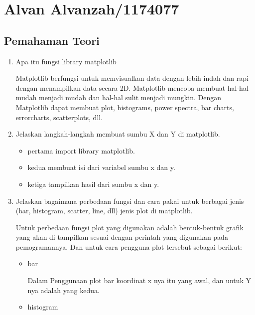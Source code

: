 \section{Alvan Alvanzah/1174077}
\subsection{Pemahaman Teori}

\begin{enumerate}
    \item Apa itu fungsi library matplotlib
    \par Matplotlib berfungsi untuk memvisualkan data dengan lebih indah dan rapi dengan menampilkan data secara 2D. Matplotlib mencoba membuat hal-hal mudah menjadi mudah dan hal-hal sulit menjadi mungkin. Dengan Matplotlib dapat membuat plot, histograms, power spectra, bar charts, errorcharts, scatterplots, dll.
    
    \item Jelaskan langkah-langkah membuat sumbu X dan Y di matplotlib.
    \begin{itemize}
        \item pertama import library matplotlib.
        \item kedua membuat isi dari variabel sumbu x dan y.
        \item ketiga tampilkan hasil dari sumbu x dan y.
    \end{itemize}
    
    
    \item Jelaskan bagaimana perbedaan fungsi dan cara pakai untuk berbagai jenis (bar, histogram, scatter, line, dll) jenis plot di matplotlib.
    \par Untuk perbedaan fungsi plot yang digunakan adalah bentuk-bentuk grafik yang akan di tampilkan sesuai dengan perintah yang digunakan pada pemogramannya.
    Dan untuk cara pengguna plot tersebut sebagai berikut:
    \begin{itemize}
        \item bar
        
        Dalam Penggunaan plot bar koordinat x nya itu yang awal, dan untuk Y nya adalah yang kedua.
        
        \item histogram
        

\end{itemize}
\end{enumerate}
